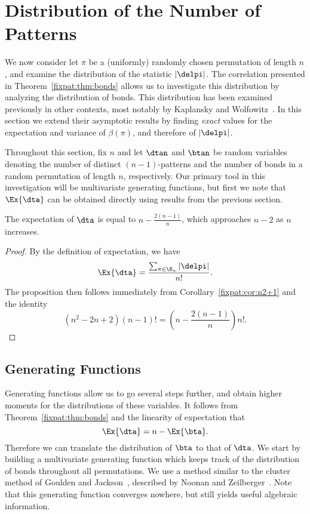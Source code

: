 \documentclass[12pt,twoside]{memoir}
\begin{document}
      
    
  \section{Distribution of the Number of Patterns}
    \label{fixpat:sec:delpi}

    We now consider let $\pi$ be a (uniformly) randomly  chosen
    permutation of length $n$, and examine the distribution of the statistic
    $|\delpi|$. The correlation presented in Theorem~\ref{fixpat:thm:bonds}
    allows us to investigate this distribution by analyzing the distribution of
    bonds. This distribution has been examined previously in other contexts, most
    notably by Kaplansky and Wolfowitz~\cite{Kaplansky, Wolfowitz}. In this
    section we extend their asymptotic results by finding \emph{exact} values for
    the expectation and variance of $\beta(\pi)$, and therefore of $|\delpi|$. 

    Throughout this section, fix $n$ and let $\dtan$ and $\btan$ be random
    variables denoting the number of distinct $(n-1)$-patterns and the number of
    bonds in a random permutation of length $n$, respectively.  Our primary tool
    in this investigation will be multivariate generating functions, but first we
    note that $\Ex{\dta}$ can be obtained directly using results from the
    previous section. 

    \begin{proposition} \label{fixpat:prop:easyexpectation}
      The expectation of $\dta$ is equal to $n - \frac{2(n-1)}{n}$, which
      approaches $n-2$ as $n$ increases. 
    \end{proposition}
    \begin{proof}
      By the definition of expectation, we have 
      $$ \Ex{\dta} = \frac{\sum_{\pi \in \S_n} |\delpi| }{n!}. $$
      The proposition then follows immediately from
      Corollary~\ref{fixpat:cor:n2+1} and the identity
      $$ (n^2 - 2n + 2) (n-1)! = \left(n - \frac{2(n-1)}{n}\right) n!.$$
    \end{proof}


  \subsection{Generating Functions}

    Generating functions allow us to go several steps further, and obtain
    higher moments for the distributions of these variables. It follows from
    Theorem~\ref{fixpat:thm:bonds} and the linearity of expectation
     that 
    $$ \Ex{\dta} = n - \Ex{\bta}.$$
    Therefore we can translate the distribution of $\bta$ to that of $\dta$. 
    We start by building a multivariate generating function which keeps track
    of the distribution of bonds throughout all permutations. We use a method
    similar to the cluster method of Goulden and Jackson~\cite{gouldenjackson1,
    gouldenjackson2}, described by Noonan and Zeilberger~\cite{Noonan1999}. Note
    that this generating function converges nowhere, but still yields useful
    algebraic information. 
\end{document}

